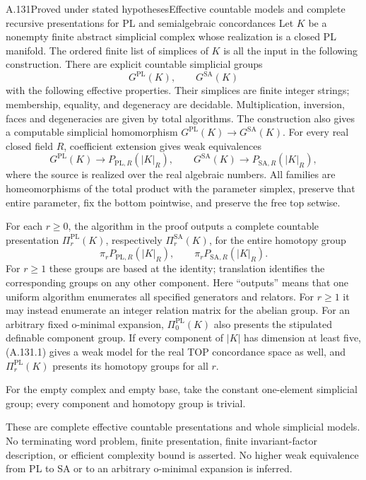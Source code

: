\clearpage
\begin{saresult}{A.131}{Proved under stated hypotheses}{Effective countable models and complete recursive presentations for PL and semialgebraic concordances}
Let $K$ be a nonempty finite abstract simplicial complex whose realization
is a closed PL manifold. The ordered finite list of simplices of $K$ is
all the input in the following construction. There are explicit
countable simplicial groups
\[
 G^{\mathrm{PL}}(K),\qquad G^{\mathrm{SA}}(K)
                                                        \tag{A.131.1}
\]
with the following effective properties. Their simplices are finite
integer strings; membership, equality, and degeneracy are decidable.
Multiplication, inversion, faces and degeneracies are given by total
algorithms. The construction also gives a computable simplicial
homomorphism $G^{\mathrm{PL}}(K)\to G^{\mathrm{SA}}(K)$.
For every real closed field $R$, coefficient extension gives weak
equivalences
\[
 G^{\mathrm{PL}}(K)\longrightarrow P_{\mathrm{PL},R}(|K|_R),
 \qquad
 G^{\mathrm{SA}}(K)\longrightarrow P_{\mathrm{SA},R}(|K|_R),
                                                        \tag{A.131.2}
\]
where the source is realized over the real algebraic numbers.
All families are homeomorphisms of the total product with the
parameter simplex, preserve that entire parameter, fix the bottom
pointwise, and preserve the free top setwise.

For each $r\ge0$, the algorithm in the proof outputs a complete
countable presentation $\Pi_r^{\mathrm{PL}}(K)$, respectively
$\Pi_r^{\mathrm{SA}}(K)$, for the entire homotopy group
\[
 \pi_rP_{\mathrm{PL},R}(|K|_R),\qquad
 \pi_rP_{\mathrm{SA},R}(|K|_R).
                                                        \tag{A.131.3}
\]
For $r\ge1$ these groups are based at the identity; translation
identifies the corresponding groups on any other component.
Here ``outputs'' means that one uniform algorithm enumerates all
specified generators and relators. For $r\ge1$ it may instead
enumerate an integer relation matrix for the abelian group.
For an arbitrary fixed o-minimal expansion, $\Pi_0^{\mathrm{PL}}(K)$
also presents the stipulated definable component group. If every
component of $|K|$ has dimension at least five, (A.131.1) gives a
weak model for the real TOP concordance space as well, and
$\Pi_r^{\mathrm{PL}}(K)$ presents its homotopy groups for all $r$.

For the empty complex and empty base, take the constant one-element
simplicial group; every component and homotopy group is trivial.

These are complete effective countable presentations and whole
simplicial models. No terminating word problem, finite presentation,
finite invariant-factor description, or efficient complexity bound
is asserted. No higher weak equivalence from PL to SA or to an
arbitrary o-minimal expansion is inferred.
\end{saresult}
